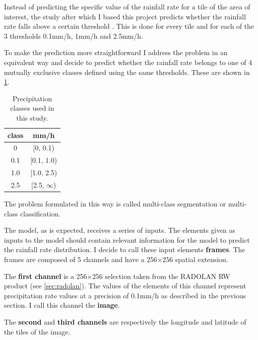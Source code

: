 Instead of predicting the specific value of the rainfall rate for a tile of the area of interest, the study after which I based this project predicts whether the rainfall rate falls above a certain threshold \citep{Agrawal2019MachineImages}. This is done for every tile and for each of the 3 thresholds 0.1mm/h, 1mm/h and 2.5mm/h.

To make the prediction more straightforward I address the problem in an equivalent way and decide to predict whether the rainfall rate belongs to one of 4 mutually exclusive classes defined using the same thresholds. These are shown in \cref{tab:prec_classes}.

\begin{table}[!h]
    \centering
    \begin{tabular}{cc}
    \hline
    class & mm/h \\
    \hline
    \hline
   0 & [0, 0.1) \\
   \hline
   0.1 & [0.1, 1.0) \\
   \hline
   1.0 &[1.0, 2.5) \\
   \hline
   2.5 &[2.5, $\infty$) \\
   \hline
    \end{tabular}
    \caption{Precipitation classes used in this study.}
    \label{tab:prec_classes}
\end{table}

The problem formulated in this way is called multi-class segmentation or multi-class classification.

The model, as is expected, receives a series of inputs. The elements given as inputs to the model should contain relevant information for the model to predict the rainfall rate distribution. I decide to call these input elements \textbf{frames}. The frames are composed of 5 channels and have a 256$\times$256 spatial extension. 

The \textbf{first channel} is a 256$\times$256 selection taken from the RADOLAN RW product (see \cref{sec:radolan}). The values of the elements of this channel represent precipitation rate values at a precision of 0.1mm/h as described in the previous section. I call this channel the \textbf{image}.

The \textbf{second} and \textbf{third channels} are respectively the longitude and latitude of the tiles of the image.

